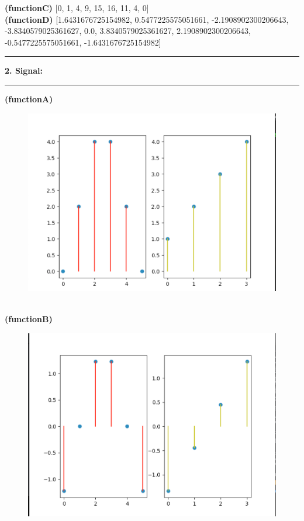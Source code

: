 \documentclass[11pt]{article}
\newcommand\question[2]{\vspace{.25in}\hrule\textbf{#1: #2}\vspace{.5em}\hrule\vspace{.10in}}
\renewcommand\part[1]{\vspace{.10in}\textbf{(#1)}}
\begin{document}
    \part{functionC} [0, 1, 4, 9, 15, 16, 11, 4, 0]\\
     \part{functionD} [1.6431676725154982, 0.5477225575051661, -2.1908902300206643, -3.8340579025361627, 0.0, 3.8340579025361627, 2.1908902300206643, -0.5477225575051661, -1.6431676725154982]\\
     \cleardoublepage
     
     \question{2. Signal}{}
     \part{functionA}
     \begin{figure}[h]
         \centering
         \includegraphics[width=0.5\linewidth]{figures/2a.png}
         \label{fig:2a}
     \end{figure}\\
     \part{functionB}
     \begin{figure}[h]
         \centering
         \includegraphics[width=0.5\linewidth]{figures/2b.png}
         \label{fig:2b}
     \end{figure}\\
\end{document}
